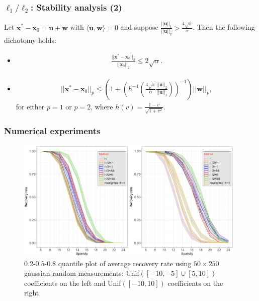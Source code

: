 \documentclass[11pt]{beamer}
\def\x{{\mathbf x}}
\def\u{{\mathbf{u}}}
\def\w{{\mathbf{w}}}
\begin{document}
\begin{frame}
\frametitle{$\ell_1/\ell_2$: Stability analysis (2)}

\begin{Theorem}
Let $\x^*-\x_0=\u+\w$ with $\langle \u, \w\rangle=0$ and suppose $\frac{||\u||_1}{||\u||_2}>\frac{4\sqrt{s}}{\alpha}$. Then the following dichotomy holds:
\begin{itemize}
\item 
\begin{align*}
\frac{||\x^*-\x_0||_2}{||\x_0||_2}\leq 2\sqrt{\alpha}. 
\end{align*}  

\item \begin{align*}
||\x^*-\x_0||_p\leq \left(1+\left(h^{-1}\left(\frac{4\sqrt{s}}{\alpha}\frac{||\u||_2}{||\u||_1}\right)\right)^{-1}\right)||\w||_p,
\end{align*}
for either $p=1$ or $p=2$,  where $h(v)=\frac{1-v}{\sqrt{1+v^2}}$.  
\end{itemize}
\end{Theorem}


\end{frame}




\begin{frame}
\frametitle{Numerical experiments}

\begin{figure}
\begin{center}
\includegraphics[width=11cm]{comparison1.png}
\caption{$0.2$-$0.5$-$0.8$ quantile plot of average recovery rate using $50\times 250$ gaussian random measurements: Unif$([-10, -5]\cup [5, 10])$ coefficients on the left and Unif$([-10, 10])$ coefficients on the right.}
\end{center}
\end{figure}


\end{frame}
\end{document}
